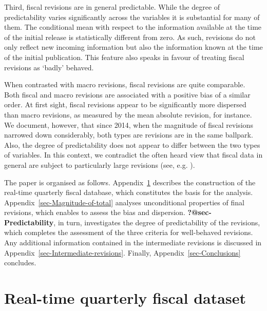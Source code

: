 \documentclass[
  letterpaper,
  authoryear,
  preprint,
  3p]{elsarticle}
\begin{document}
Third, fiscal revisions are in general predictable. While the degree of
predictability varies significantly across the variables it is
substantial for many of them. The conditional mean with respect to the
information available at the time of the initial release is
statistically different from zero. As such, revisions do not only
reflect new incoming information but also the information known at the
time of the initial publication. This feature also speaks in favour of
treating fiscal revisions as `badly' behaved.

When contrasted with macro revisions, fiscal revisions are quite
comparable. Both fiscal and macro revisions are associated with a
positive bias of a similar order. At first sight, fiscal revisions
appear to be significantly more dispersed than macro revisions, as
measured by the mean absolute revision, for instance. We document,
however, that since 2014, when the magnitude of fiscal revisions
narrowed down considerably, both types are revisions are in the same
ballpark. Also, the degree of predictability does not appear to differ
between the two types of variables. In this context, we contradict the
often heard view that fiscal data in general are subject to particularly
large revisions (see, e.g. \citet{Cimadomo_2016_jes}).

The paper is organised as follows.
Appendix~\ref{sec-Real-time-quarterly-fiscal} describes the construction
of the real-time quarterly fiscal database, which constitutes the basis
for the analysis. Appendix~\ref{sec-Magnitude-of-total} analyses
unconditional properties of final revisions, which enables to assess the
bias and dispersion. \textbf{?@sec-Predictability}, in turn,
investigates the degree of predictability of the revisions, which
completes the assessment of the three criteria for well-behaved
revisions. Any additional information contained in the intermediate
revisions is discussed in Appendix~\ref{sec-Intermediate-revisions}.
Finally, Appendix~\ref{sec-Conclusions} concludes.


\hypertarget{sec-Real-time-quarterly-fiscal}{%
\chapter{Real-time quarterly fiscal
dataset}\label{sec-Real-time-quarterly-fiscal}}
\end{document}
